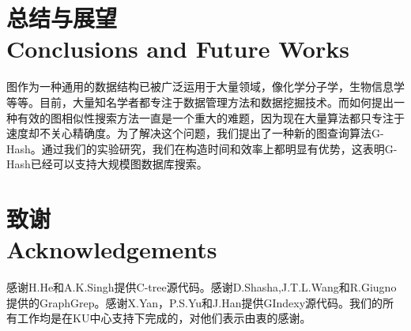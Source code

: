 \documentclass{article}
\begin{document}
\else

\fi
\chapter{总结与展望 \\ Conclusions and Future Works}
图作为一种通用的数据结构已被广泛运用于大量领域，像化学分子学，生物信息学等等。目前，大量知名学者都专注于数据管理方法和数据挖掘技术。而如何提出一种有效的图相似性搜索方法一直是一个重大的难题，因为现在大量算法都只专注于速度却不关心精确度。为了解决这个问题，我们提出了一种新的图查询算法G-Hash。通过我们的实验研究，我们在构造时间和效率上都明显有优势，这表明G-Hash已经可以支持大规模图数据库搜索。
\chapter{致谢 \\ Acknowledgements}
感谢H.He和A.K.Singh提供C-tree源代码。感谢D.Shasha,J.T.L.Wang和R.Giugno提供的GraphGrep。感谢X.Yan，P.S.Yu和J.Han提供GIndexy源代码。我们的所有工作均是在KU中心支持下完成的，对他们表示由衷的感谢。
\ifx\allfiles\undefined
%
%
\end{document}
